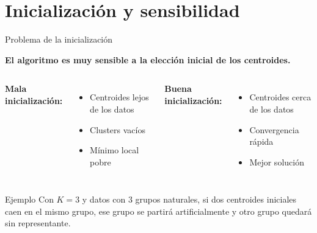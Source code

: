 \documentclass[aspectratio=169]{beamer}
\begin{document}
\section{Inicialización y sensibilidad}

\begin{frame}{Problema de la inicialización}
    \begin{center}
        \textbf{El algoritmo es muy sensible a la elección inicial de los centroides.}
    \end{center}
    
    \begin{columns}
        \textbf{Mala inicialización:}
        \begin{itemize}
            \item Centroides lejos de los datos
            \item Clusters vacíos
            \item Mínimo local pobre
        \end{itemize}
        
        \textbf{Buena inicialización:}
        \begin{itemize}
            \item Centroides cerca de los datos
            \item Convergencia rápida
            \item Mejor solución
        \end{itemize}
    \end{columns}
    
    \vspace{0.3cm}
    \begin{exampleblock}{Ejemplo}
        Con \(K=3\) y datos con 3 grupos naturales, si dos centroides iniciales caen en el mismo grupo, ese grupo se partirá artificialmente y otro grupo quedará sin representante.
    \end{exampleblock}
\end{frame}
\end{document}

